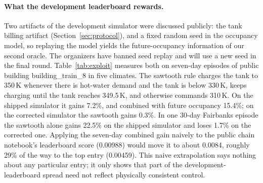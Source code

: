 \documentclass{article}
\begin{document}
\paragraph{What the development leaderboard rewards.} Two artifacts of the development simulator were discussed publicly: the tank billing artifact (Section~\ref{sec:protocol}), and a fixed random seed in the occupancy model, so replaying the model yields the future-occupancy information of our second oracle. The organizers have banned seed replay and will use a new seed in the final round. Table~\ref{tab:exploit} measures both on seven-day episodes of public building building\_train\_8 in five climates. The sawtooth rule charges the tank to 350\,K whenever there is hot-water demand and the tank is below 330\,K, keeps charging until the tank reaches 349.5\,K, and otherwise commands 310\,K. On the shipped simulator it gains 7.2\%, and combined with future occupancy 15.4\%; on the corrected simulator the sawtooth gains 0.3\%. In one 30-day Fairbanks episode the sawtooth alone gains 22.5\% on the shipped simulator and loses 1.7\% on the corrected one. Applying the seven-day combined gain naively to the public chain notebook's leaderboard score (0.00988) would move it to about 0.0084, roughly 29\% of the way to the top entry (0.00459). This naive extrapolation says nothing about any particular entry; it only shows that part of the development-leaderboard spread need not reflect physically consistent control.

\begin{table}[t]
  \caption{Simulator-artifact accounting: seven-day episodes of building\_train\_8 in five climates, scores in $10^{-3}$. Gains are relative to the public chain on the same simulator; positive gain is better.}
  \label{tab:exploit}
  \centering
  \small
  
\end{table}
\end{document}

